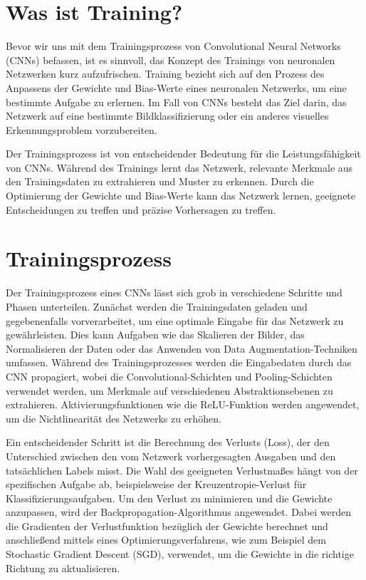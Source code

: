\section{Was ist Training?}
    Bevor wir uns mit dem Trainingsprozess von Convolutional Neural Networks (CNNs) befassen, ist es sinnvoll, das Konzept des Trainings von neuronalen Netzwerken kurz aufzufrischen. Training bezieht sich auf den Prozess des Anpassens der Gewichte und Bias-Werte eines neuronalen Netzwerks, um eine bestimmte Aufgabe zu erlernen. Im Fall von CNNs besteht das Ziel darin, das Netzwerk auf eine bestimmte Bildklassifizierung oder ein anderes visuelles Erkennungsproblem vorzubereiten.
    
    Der Trainingsprozess ist von entscheidender Bedeutung für die Leistungsfähigkeit von CNNs. Während des Trainings lernt das Netzwerk, relevante Merkmale aus den Trainingsdaten zu extrahieren und Muster zu erkennen. Durch die Optimierung der Gewichte und Bias-Werte kann das Netzwerk lernen, geeignete Entscheidungen zu treffen und präzise Vorhersagen zu treffen.

\section{Trainingsprozess}
    Der Trainingsprozess eines CNNs lässt sich grob in verschiedene Schritte und Phasen unterteilen. Zunächst werden die Trainingsdaten geladen und gegebenenfalls vorverarbeitet, um eine optimale Eingabe für das Netzwerk zu gewährleisten. Dies kann Aufgaben wie das Skalieren der Bilder, das Normalisieren der Daten oder das Anwenden von Data Augmentation-Techniken umfassen.
    Während des Trainingsprozesses werden die Eingabedaten durch das CNN propagiert, wobei die Convolutional-Schichten und Pooling-Schichten verwendet werden, um Merkmale auf verschiedenen Abstraktionsebenen zu extrahieren. Aktivierungsfunktionen wie die ReLU-Funktion werden angewendet, um die Nichtlinearität des Netzwerks zu erhöhen.
    
    Ein entscheidender Schritt ist die Berechnung des Verlusts (Loss), der den Unterschied zwischen den vom Netzwerk vorhergesagten Ausgaben und den tatsächlichen Labels misst. Die Wahl des geeigneten Verlustmaßes hängt von der spezifischen Aufgabe ab, beispielsweise der Kreuzentropie-Verlust für Klassifizierungsaufgaben.
    Um den Verlust zu minimieren und die Gewichte anzupassen, wird der Backpropagation-Algorithmus angewendet. Dabei werden die Gradienten der Verlustfunktion bezüglich der Gewichte berechnet und anschließend mittels eines Optimierungsverfahrens, wie zum Beispiel dem Stochastic Gradient Descent (SGD), verwendet, um die Gewichte in die richtige Richtung zu aktualisieren.
    

